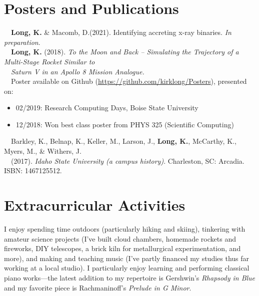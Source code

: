 \documentclass[11pt]{article}
\begin{document}
\section{Posters and Publications}
\-\ \-\ \textbf{Long, K.} \& Macomb, D.(2021). Identifying accreting x-ray binaries. \textit{In preparation}.\vspace{1mm} \\
\-\ \-\ \textbf{Long, K.} (2018). \textit{To the Moon and Back -- Simulating the Trajectory of a Multi-Stage Rocket Similar to} \\
\-\ \-\ \textit{Saturn V in an Apollo 8 Mission Analogue.}\vspace{1mm}\\
\-\ \-\ Poster available on Github (\url{https://github.com/kirklong/Posters}), presented on:
\-\ \-\ \begin{itemize}[noitemsep]
              \item 02/2019: Research Computing Days, Boise State University
              \item 12/2018: Won best class poster from PHYS 325 (Scientific Computing)
        \end{itemize}
\-\ \-\ Barkley, K., Belnap, K., Keller, M., Larson, J., \textbf{Long, K.}, McCarthy, K., Myers, M., \& Withers, J. \\
 \-\ \-\ (2017). \textit{Idaho State University (a campus history)}. Charleston, SC: Arcadia. ISBN: 1467125512.

\section{Extracurricular Activities}
I enjoy spending time outdoors (particularly hiking and skiing), tinkering with amateur science projects (I've built cloud chambers, homemade rockets and fireworks, DIY telescopes, a brick kiln for metallurgical experimentation, and more), and making and teaching music (I've partly financed my studies thus far working at a local studio). I particularly enjoy learning and performing classical piano works---the latest addition to my repertoire is Gershwin's \textit{Rhapsody in Blue} and my favorite piece is Rachmaninoff's \textit{Prelude in G Minor}.
\end{document}

